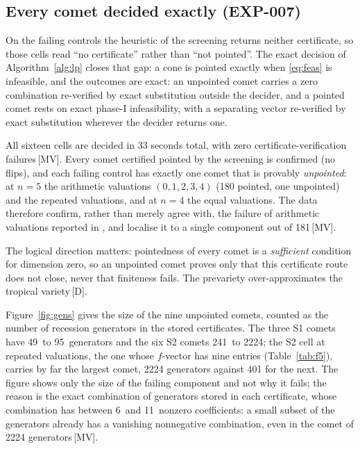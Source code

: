 \documentclass[11pt]{article}
\theoremstyle{definition}
\theoremstyle{remark}
\newcommand{\numCertNzMin}{6}
\newcommand{\numCertNzMax}{11}
\newcommand{\numGenSoneMin}{49}
\newcommand{\numGenSoneMax}{95}
\newcommand{\numGenStwoMin}{241}
\newcommand{\numGenStwoMax}{2224}
\newcommand{\mk}[1]{\,{\scriptsize[#1]}}
\newcommand{\MV}{\mk{MV}}
\newcommand{\Dm}{\mk{D}}
\begin{document}
\subsection{Every comet decided exactly (EXP-007)}\label{sec:exact}

On the failing controls the heuristic of the screening returns neither certificate,
so those cells read ``no certificate'' rather than ``not pointed''. The exact decision of
Algorithm~\ref{alg:lp} closes that gap: a cone is pointed exactly when \eqref{eq:feas} is
infeasible, and the outcomes are exact: an unpointed comet carries a zero combination re-verified by exact substitution outside the decider, and a pointed
comet rests on exact phase-I infeasibility, with a separating vector re-verified by exact substitution wherever the decider returns one.

All sixteen cells are decided in 33 seconds total, with zero
certificate-verification failures\MV. Every comet certified pointed by the screening is
confirmed (no flips), and each failing control has exactly one comet that is
provably \emph{unpointed}: at $n=5$ the arithmetic valuations $(0,1,2,3,4)$ (180 pointed,
one unpointed) and the repeated valuations, and at $n=4$ the equal valuations. The data
therefore confirm, rather than merely agree with, the
failure of arithmetic valuations reported in \cite{JL25}, and localise it to a
single component out of 181\MV.

The logical direction matters: pointedness of every comet is a
\emph{sufficient} condition for dimension zero, so an unpointed comet proves
only that this certificate route does not close, never that finiteness fails. The
prevariety over-approximates the tropical variety\Dm.

Figure~\ref{fig:gens} gives the size of the nine unpointed comets, counted as the number of recession
generators in the stored certificates. The three S1 comets have \numGenSoneMin\ to \numGenSoneMax\ generators and the six S2 comets
\numGenStwoMin\ to \numGenStwoMax; the S2 cell at repeated valuations, the one whose $f$-vector has nine
entries (Table~\ref{tab:f5}), carries by far the largest comet, 2224 generators against 401 for the next. The figure shows only the size of the
failing component and not why it fails; the reason is the exact combination of generators stored in each
certificate, whose combination has between \numCertNzMin\ and \numCertNzMax\ nonzero coefficients: a small subset of the
generators already has a vanishing nonnegative combination, even in the comet of 2224 generators\MV.
\end{document}
